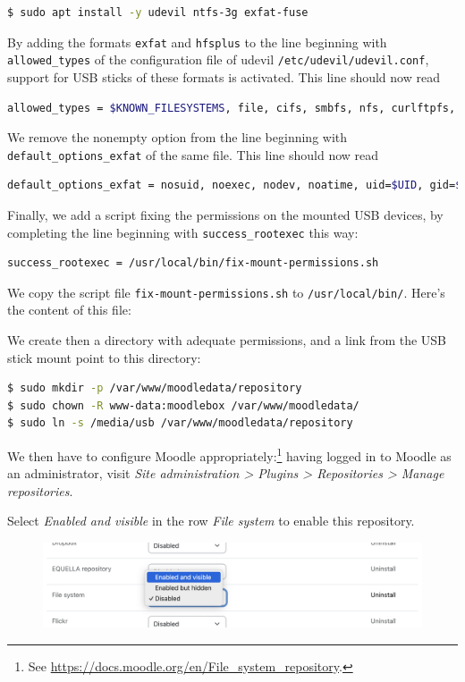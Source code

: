 \documentclass[12pt]{article}
\begin{document}
\begin{lstlisting}[language=bash]
$ sudo apt install -y udevil ntfs-3g exfat-fuse
\end{lstlisting}
By adding the formats \lstinline{exfat} and \lstinline{hfsplus} to the line beginning with \lstinline{allowed_types} of the configuration file of udevil \lstinline{/etc/udevil/udevil.conf}, support for USB sticks of these formats is activated.
This line should now read
\begin{lstlisting}[language=bash]
allowed_types = $KNOWN_FILESYSTEMS, file, cifs, smbfs, nfs, curlftpfs, ftpfs, sshfs, davfs, tmpfs, ramfs, exfat, hfsplus
\end{lstlisting}
We remove the nonempty option from the line beginning with \lstinline{default_options_exfat} of the same file.
This line should now read
\begin{lstlisting}[language=bash]
default_options_exfat = nosuid, noexec, nodev, noatime, uid=$UID, gid=$GID, iocharset=utf8
\end{lstlisting}
Finally, we add a script fixing the permissions on the mounted USB devices, by completing the line beginning with \lstinline{success_rootexec} this way:
\begin{lstlisting}[language=bash]
success_rootexec = /usr/local/bin/fix-mount-permissions.sh
\end{lstlisting}
We copy the script file \lstinline{fix-mount-permissions.sh} to \lstinline{/usr/local/bin/}.
Here's the content of this file:


We create then a directory with adequate permissions, and a link from the USB stick mount point to this directory:
\begin{lstlisting}[language=bash]
$ sudo mkdir -p /var/www/moodledata/repository
$ sudo chown -R www-data:moodlebox /var/www/moodledata/
$ sudo ln -s /media/usb /var/www/moodledata/repository
\end{lstlisting}

We then have to configure Moodle appropriately:\footnote{See \url{https://docs.moodle.org/en/File_system_repository}.}
having logged in to Moodle as an administrator, visit \emph{Site administration > Plugins > Repositories > Manage repositories}.

Select \emph{Enabled and visible} in the row \emph{File system} to enable this repository.
\begin{figure}[!ht]
\centering
\includegraphics[width=14cm]{repo-filesystem-usb-1.png}
\end{figure}
\end{document}
